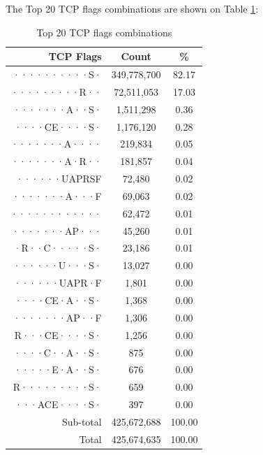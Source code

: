 \newpage
The Top 20 TCP flags combinations are shown on Table \ref{tab:top20tcpflagscombinations}:
\begin{table}[!h]
\begin{center}
\caption{Top 20 TCP flags combinations}
\label{tab:top20tcpflagscombinations}
\begin{tabular}{ |r|c|c| }
\hline
\centering TCP Flags & Count & \%  \\
\hline
··········S· & 349,778,700 & 82.17  \\
·········R·· & 72,511,053 & 17.03  \\
·······A··S· & 1,511,298 & 0.36  \\
····CE····S· & 1,176,120 & 0.28  \\
·······A···· & 219,834 & 0.05  \\
·······A·R·· & 181,857 & 0.04  \\
······UAPRSF & 72,480 & 0.02  \\
·······A···F & 69,063 & 0.02  \\
············ & 62,472 & 0.01  \\
·······AP··· & 45,260 & 0.01  \\
·R··C·····S· & 23,186 & 0.01  \\
······U···S· & 13,027 & 0.00  \\
······UAPR·F & 1,801 & 0.00  \\
····CE·A··S· & 1,368 & 0.00  \\
·······AP··F & 1,306 & 0.00  \\
R···CE····S· & 1,256 & 0.00  \\
····C··A··S· & 875 & 0.00  \\
·····E·A··S· & 676 & 0.00  \\
R·········S· & 659 & 0.00  \\
···ACE····S· & 397 & 0.00  \\
\hline
Sub-total & 425,672,688 & 100.00  \\
\hline
Total & 425,674,635 & 100.00  \\
\hline
\end{tabular}
\end{center}
\end{table}

